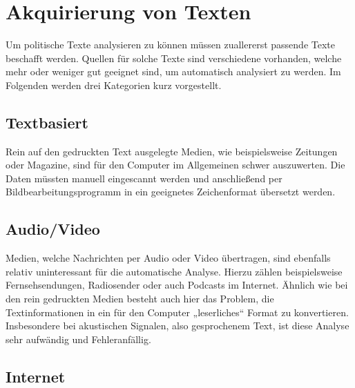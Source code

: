 

\section{Akquirierung von Texten}
Um politische Texte analysieren zu können müssen zuallererst passende Texte beschafft werden. Quellen für solche Texte sind verschiedene vorhanden, welche mehr oder weniger gut geeignet sind, um automatisch analysiert zu werden. Im Folgenden werden drei Kategorien kurz vorgestellt.

\subsection{Textbasiert}
Rein auf den gedruckten Text ausgelegte Medien, wie beispielsweise Zeitungen oder Magazine, sind für den Computer im Allgemeinen schwer auszuwerten. Die Daten müssten manuell eingescannt werden und anschließend per Bildbearbeitungsprogramm in ein geeignetes Zeichenformat übersetzt werden. 

\subsection{Audio/Video}
Medien, welche Nachrichten per Audio oder Video übertragen, sind ebenfalls relativ uninteressant für die automatische Analyse. Hierzu zählen beispielsweise Fernsehsendungen, Radiosender oder auch Podcasts im Internet. Ähnlich wie bei den rein gedruckten Medien besteht auch hier das Problem, die Textinformationen in ein für den Computer „leserliches“ Format zu konvertieren. Insbesondere bei akustischen Signalen, also gesprochenem Text, ist diese Analyse sehr aufwändig und Fehleranfällig. 

\subsection{Internet}	

